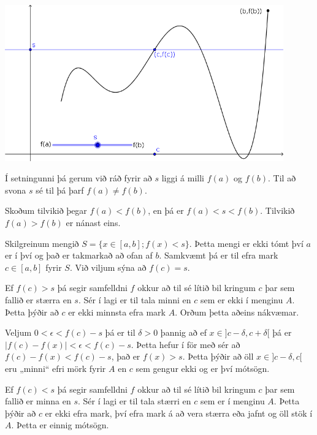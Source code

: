 \documentclass[b5paper,10pt,icelandic]{sphinxmanual}
\begin{document}
\begin{center}
\includegraphics[width=12cm,keepaspectratio=true]{10_milligildissetn.png}
\end{center}



Í setningunni þá gerum við ráð fyrir að \(s\) liggi á milli \(f(a)\) og
\(f(b)\). Til að svona \(s\) sé til þá þarf \(f(a) \neq f(b)\).

Skoðum tilvikið þegar \(f(a) < f(b)\), en þá er \(f(a) < s < f(b)\).
Tilvikið \(f(a)>f(b)\) er nánast eins.

Skilgreinum mengið \(S = \{ x \in [a,b] ; f(x) < s\}\). Þetta mengi er ekki tómt
því \(a\) er í því og það er takmarkað að ofan af \(b\). Samkvæmt
{\hyperref[\detokenize{kafli01:frumsendanumeframark}]{}} þá er til efra mark \(c \in[a,b]\)
fyrir \(S\). Við viljum sýna að \(f(c)=s\).

Ef \(f(c)>s\) þá segir samfelldni \(f\)
okkur að til sé lítið bil kringum \(c\) þar sem fallið er stærra en \(s\). Sér í lagi er
til tala minni en \(c\) sem er ekki í menginu \(A\). Þetta þýðir að \(c\) er
ekki minnsta efra mark \(A\). Orðum þetta aðeins nákvæmar.

Veljum \(0<\epsilon < f(c)-s\) þá er til \(\delta>0\) þannig að ef \(x\in ]c-\delta,c+\delta[\)
þá er \(|f(c)-f(x)|<\epsilon < f(c) -s\). Þetta hefur í för með sér að \(f(c) - f(x) < f(c) -s\),
það er \(f(x)>s\). Þetta þýðir að öll \(x\in]c-\delta,c[\) eru „minni“ efri mörk fyrir \(A\)
en \(c\) sem gengur ekki og er því mótsögn.

Ef \(f(c)<s\) þá segir samfelldni \(f\) okkur að til sé lítið bil kringum \(c\)
þar sem fallið er minna en \(s\). Sér í lagi  er til tala stærri en \(c\) sem er í menginu
\(A\). Þetta þýðir að \(c\) er ekki efra mark, því efra mark á að vera stærra eða jafnt
og öll stök í \(A\). Þetta er einnig mótsögn.
\end{document}
